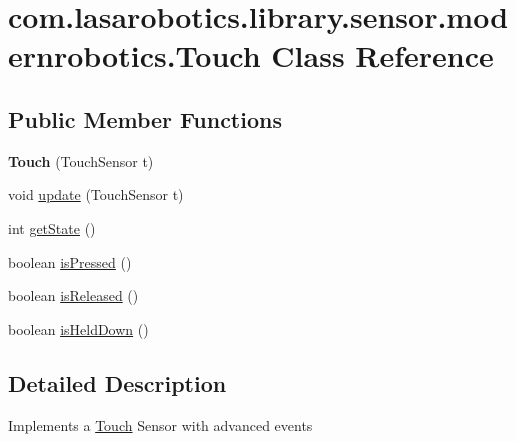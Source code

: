 \hypertarget{classcom_1_1lasarobotics_1_1library_1_1sensor_1_1modernrobotics_1_1_touch}{}\section{com.\+lasarobotics.\+library.\+sensor.\+modernrobotics.\+Touch Class Reference}
\label{classcom_1_1lasarobotics_1_1library_1_1sensor_1_1modernrobotics_1_1_touch}
\subsection*{Public Member Functions}
\begin{DoxyCompactItemize}
\item 
\hypertarget{classcom_1_1lasarobotics_1_1library_1_1sensor_1_1modernrobotics_1_1_touch_a6c66bf0666ef8396b17b080423b03864}{}{\bfseries Touch} (Touch\+Sensor t)\label{classcom_1_1lasarobotics_1_1library_1_1sensor_1_1modernrobotics_1_1_touch_a6c66bf0666ef8396b17b080423b03864}

\item 
void \hyperlink{classcom_1_1lasarobotics_1_1library_1_1sensor_1_1modernrobotics_1_1_touch_a6f7e58387c97d03cabda91e43fb078fa}{update} (Touch\+Sensor t)
\item 
int \hyperlink{classcom_1_1lasarobotics_1_1library_1_1sensor_1_1modernrobotics_1_1_touch_aa65a80243af944ca2e2b6e0868c185be}{get\+State} ()
\item 
boolean \hyperlink{classcom_1_1lasarobotics_1_1library_1_1sensor_1_1modernrobotics_1_1_touch_a67067f72367abd55e183fd637aca099c}{is\+Pressed} ()
\item 
boolean \hyperlink{classcom_1_1lasarobotics_1_1library_1_1sensor_1_1modernrobotics_1_1_touch_a795c6a8b7eacbd41f9b4d1207c1aa0f1}{is\+Released} ()
\item 
boolean \hyperlink{classcom_1_1lasarobotics_1_1library_1_1sensor_1_1modernrobotics_1_1_touch_a4b7c04fbfbea410f0734ab2f168aafa9}{is\+Held\+Down} ()
\end{DoxyCompactItemize}


\subsection{Detailed Description}
Implements a \hyperlink{classcom_1_1lasarobotics_1_1library_1_1sensor_1_1modernrobotics_1_1_touch}{Touch} Sensor with advanced events 

